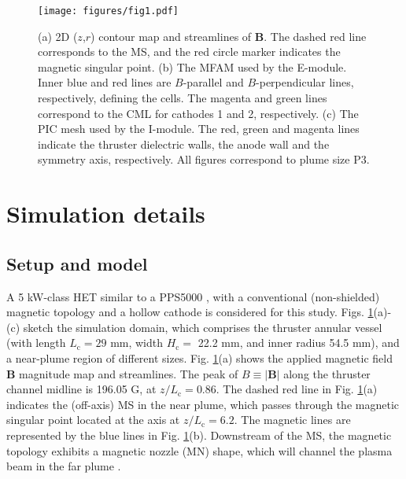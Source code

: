 \documentclass[%
 aip,
cha,
 amsmath,amssymb,
 reprint,%
]{revtex4-1}
\begin{document}
\begin{figure}[!t]
\centering
\texttt{[image: figures/fig1.pdf]}
\caption{(a) 2D ($z$,$r$) contour map and streamlines of $\bm B$. The dashed red line corresponds to the MS, and the red circle marker indicates the magnetic singular point. (b) The MFAM used by the E-module. Inner blue and red lines are $B$-parallel and $B$-perpendicular lines, respectively, defining the cells. The magenta and green lines correspond to the CML for cathodes 1 and 2, respectively. (c) The PIC mesh used by the I-module. The red, green and magenta lines indicate the thruster dielectric walls, the anode wall and the symmetry axis, respectively. All figures correspond to plume size P3.
} 
\label{fig: domain_meshes}
\end{figure}

    
\section{Simulation details}\label{sec: HYPHEN_code}


\subsection{Setup and model}
A 5 kW-class HET similar to a PPS5000 \cite{duch19,duch23}, with a conventional (non-shielded) magnetic topology and a hollow cathode is considered for this study. Figs. \ref{fig: domain_meshes}(a)-(c) sketch the simulation domain, which comprises the thruster annular vessel (with length $L_\mathrm{c} = 29$ mm, width $H_\mathrm{c} = $ 22.2 mm, and inner radius 54.5 mm), and a near-plume region of different sizes. Fig. \ref{fig: domain_meshes}(a) shows the applied magnetic field $\bm B$ magnitude map and streamlines. The peak of $B \equiv |\bm B|$ along the thruster channel midline is 196.05 G, at $z/L_\mathrm{c} = 0.86$. The dashed red line in Fig. \ref{fig: domain_meshes}(a) indicates the (off-axis) MS in the near plume, which passes through the magnetic singular point located at the axis at $z/L_\mathrm{c} = 6.2$. The magnetic lines are represented by the blue lines in Fig. \ref{fig: domain_meshes}(b).  
%
Downstream of the MS, the magnetic topology exhibits a magnetic nozzle (MN) shape, which will channel the plasma beam in the far plume \cite{ahed10f}.
%
\end{document}
